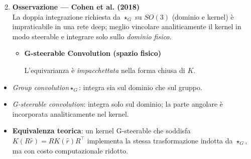 \documentclass[aspectratio=32,8pt]{beamer}
\begin{document}
\begin{frame}
    \begin{enumerate}
\setcounter{enumi}{1}
    \item \textbf{Osservazione — Cohen et al. (2018)}\\[2pt]
      La doppia integrazione richiesta da \(\star_G\) su \(SO(3)\)
      (dominio e kernel) è impraticabile in una rete deep;  
      meglio vincolare analiticamente il kernel in modo steerable
      e integrare solo sullo \emph{dominio fisico}.

\begin{itemize}
\tiny

  \item \textbf{G-steerable Convolution (spazio fisico)}\\[2pt]
  \centering

        L’equivarianza è \emph{impacchettata} nella forma chiusa di \(K\).

  \end{itemize}
  \vspace{4pt}

\end{enumerate}
        \begin{itemize}
              \item \emph{Group convolution}\(\star_G\): integra sia sul dominio che sul gruppo.
              \item \emph{G-steerable convolution}: integra solo sul dominio; la parte angolare è incorporata analiticamente nel kernel.
              \item \textbf{Equivalenza teorica}: un kernel G-steerable che soddisfa \(K(R\hat r)=R K(\hat r)R^{\!\top}\) implementa la stessa trasformazione indotta da \(\star_G\), ma con costo computazionale ridotto.
        \end{itemize}
\end{frame}
\end{document}
